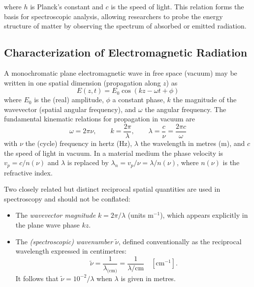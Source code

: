 \noindent where $h$ is Planck's constant and $c$ is the speed of light. This relation forms the basis for spectroscopic analysis, allowing researchers to probe the energy structure of matter by observing the spectrum of absorbed or emitted radiation.


\subsection{Characterization of Electromagnetic Radiation}
\label{subsec:em_radiation_characterization}

\noindent A monochromatic plane electromagnetic wave in free space (vacuum) may be written in one spatial dimension (propagation along $z$) as
\begin{equation}
	E(z,t) = E_0 \cos(k z - \omega t + \phi)
	\label{eq:plane_wave}
\end{equation}
where $E_0$ is the (real) amplitude, $\phi$ a constant phase, $k$ the magnitude of the wavevector (spatial angular frequency), and $\omega$ the angular frequency. The fundamental kinematic relations for propagation in vacuum are
\begin{equation}
	\omega = 2\pi\nu, \qquad k = \frac{2\pi}{\lambda}, \qquad \lambda = \frac{c}{\nu} = \frac{2\pi c}{\omega}
	\label{eq:wavelength_frequency_relation}
\end{equation}
with $\nu$ the (cycle) frequency in hertz (Hz), $\lambda$ the wavelength in metres (m), and $c$ the speed of light in vacuum. In a material medium the phase velocity is $v_p = c/n(\nu)$ and $\lambda$ is replaced by $\lambda_n = v_p/\nu = \lambda/n(\nu)$, where $n(\nu)$ is the refractive index.

\noindent Two closely related but distinct reciprocal spatial quantities are used in spectroscopy and should not be conflated:
\begin{itemize}
	\item The \emph{wavevector magnitude} $k = 2\pi/\lambda$ (units m$^{-1}$), which appears explicitly in the plane wave phase $kz$.
	\item The \emph{(spectroscopic) wavenumber} $\tilde{\nu}$, defined conventionally as the reciprocal wavelength expressed in centimetres:
	      \begin{equation}
		      \tilde{\nu} = \frac{1}{\lambda_{\text{(cm)}}} = \frac{1}{\lambda / \mathrm{cm}} \quad [\mathrm{cm}^{-1}].
		      \label{eq:wavenumber_definition}
	      \end{equation}
	      It follows that $\tilde{\nu} = 10^{-2} / \lambda$ when $\lambda$ is given in metres.
\end{itemize}

